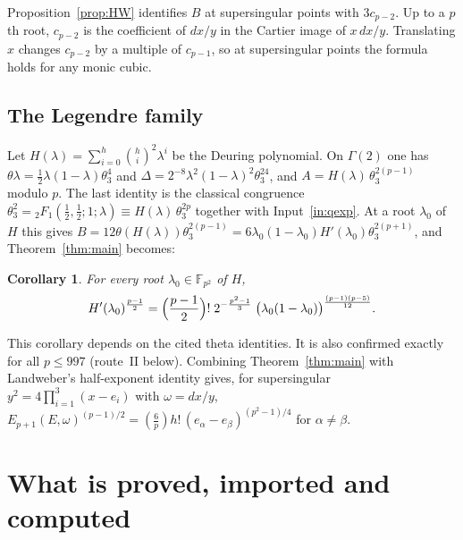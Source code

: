 \documentclass[11pt,a4paper]{article}
\numberwithin{equation}{section}
\newtheorem{corollary}[theorem]{Corollary}
\theoremstyle{definition}
\theoremstyle{remark}
\newcommand{\Fq}{\mathbb F_{p^2}}
\newcommand{\Lp}[1]{\left(\frac{#1}{p}\right)}
\begin{document}
Proposition~\ref{prop:HW} identifies $B$ at supersingular points with $3c_{p-2}$. Up to a
$p$th root, $c_{p-2}$ is the coefficient of $dx/y$ in the Cartier image of $x\,dx/y$. Translating $x$ changes $c_{p-2}$ by a
multiple of $c_{p-1}$, so at supersingular points the formula holds for any monic cubic.

\subsection{The Legendre family}
Let $H(\lambda)=\sum_{i=0}^h\binom hi^2\lambda^i$ be the Deuring polynomial. On $\Gamma(2)$
one has $\theta\lambda=\frac12\lambda(1-\lambda)\theta_3^4$ and
$\Delta=2^{-8}\lambda^2(1-\lambda)^2\theta_3^{24}$, and $A=H(\lambda)\,\theta_3^{2(p-1)}$
modulo $p$. The last identity is the classical congruence
$\theta_3^2={}_2F_1(\frac12,\frac12;1;\lambda)\equiv H(\lambda)\,\theta_3^{2p}$ together with
Input~\ref{in:qexp}. At a root $\lambda_0$ of $H$ this gives
$B=12\theta(H(\lambda))\theta_3^{2(p-1)}=6\lambda_0(1-\lambda_0)H'(\lambda_0)\theta_3^{2(p+1)}$,
and Theorem~\ref{thm:main} becomes:

\begin{corollary}\label{cor:Leg}
For every root $\lambda_0\in\Fq$ of $H$,
\[
H'(\lambda_0)^{\frac{p-1}2}=\Bigl(\frac{p-1}2\Bigr)!\;2^{-\frac{p^2-1}{3}}\;
\bigl(\lambda_0(1-\lambda_0)\bigr)^{\frac{(p-1)(p-5)}{12}}.
\]
\end{corollary}

This corollary depends on the cited theta identities. It is also confirmed exactly for all
$p\le997$ (route~II below). Combining Theorem~\ref{thm:main} with Landweber's half-exponent
identity \cite[Theorem~3, p.~72]{Landweber88} gives, for supersingular
$y^2=4\prod_{i=1}^3(x-e_i)$ with $\omega=dx/y$,
$E_{p+1}(E,\omega)^{(p-1)/2}=\Lp6h!\,(e_\alpha-e_\beta)^{(p^2-1)/4}$ for $\alpha\ne\beta$.

\section{What is proved, imported and computed}\label{sec:status}
\end{document}
